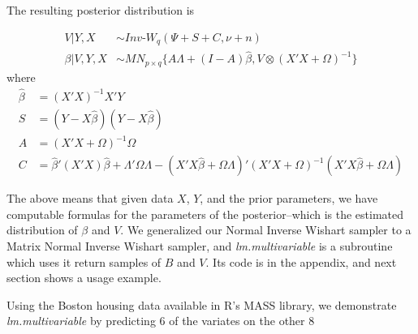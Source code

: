 \documentclass[english]{report}
\begin{document}
The resulting posterior distribution is \cite{Lysy}

\begin{align*}
	V|Y,X &\sim  Inv\text{-}W_q(\Psi+S+C,\nu+n)\\
	\beta|V,Y,X &\sim MN_{p \times q}\{A\Lambda + (I-A)\hat{\beta}, V  \otimes (X'X +\Omega)^{-1}\}
\end{align*}
where 
\begin{align*}
\hat{\beta} &= (X'X)^{-1}X'Y\\
S &= (Y-X\hat{\beta})(Y-X\hat{\beta})\\ 
A &= (X'X + \Omega)^{-1}\Omega\\
C &= \hat{\beta}'(X'X)\hat{\beta} + \Lambda'\Omega\Lambda - (X'X\hat{\beta} + \Omega\Lambda)'(X'X+\Omega)^{-1}(X'X\hat{\beta} + \Omega\Lambda)
\end{align*}

The above means that given data $X$, $Y$, and the prior parameters, we have computable formulas for the parameters of the posterior--which is the estimated distribution of $\beta$ and $V$. We generalized our Normal Inverse Wishart sampler to a Matrix Normal Inverse Wishart sampler, and \emph{lm.multivariable} is a subroutine which uses it return samples of $B$ and $V$. Its code is in the appendix, and next section shows a usage example.


Using the Boston housing data available in R's MASS library, we demonstrate \emph{lm.multivariable} by predicting 6 of the variates on the other 8\\
\end{document}
